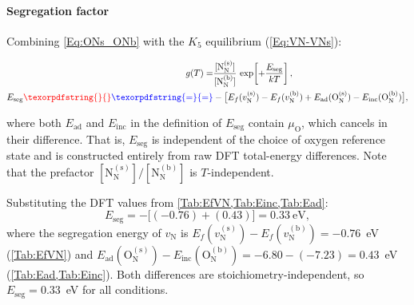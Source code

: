\documentclass[preprint,12pt,sort&compress]{elsarticle}
\newcommand{\?}{\stackrel{?}{=}}
\providecommand{\DIFaddtex}[1]{{\bf #1}} %
\providecommand{\DIFdeltex}[1]{} %
\providecommand{\DIFaddbegin}{\protect\color{blue}} %
\providecommand{\DIFaddend}{\protect\color{black}} %
\providecommand{\DIFdelbegin}{\protect\color{red}} %
\providecommand{\DIFdelend}{\protect\color{black}} %
\providecommand{\DIFadd}[1]{\texorpdfstring{\DIFaddtex{#1}}{#1}} %
\providecommand{\DIFdel}[1]{\texorpdfstring{\DIFdeltex{#1}}{}} %
\begin{document}
\paragraph{Segregation factor} Combining \cref{Eq:ONs_ONb} with the $K_5$ equilibrium (\cref{Eq:VN-VNs}):

\begin{align}
g(T) = & \frac{[\text{N}_\text{N}^{(\text{s})}]}{[\text{N}_\text{N}^{(\text{b})}]}\,\exp\!\left[+\frac{E_\text{seg}}{kT}\right], \\
E_\text{seg} \DIFdelbegin \DIFdel{\equiv }\DIFdelend \DIFaddbegin \DIFadd{= }\DIFaddend & -\bigl[E_f(v_\text{N}^{(\text{s})}) - E_f(v_\text{N}^{(\text{b})}) + E_\text{ad}(\text{O}_\text{N}^{(\text{s})}) - E_\text{inc}(\text{O}_\text{N}^{(\text{b})})\bigr],
\label{Eq:App:gT}
\end{align}

where both $E_\text{ad}$ and $E_\text{inc}$ in the definition of $E_\text{seg}$ contain $\mu_\text{O}$, which cancels in their difference. That is, $E_\text{seg}$ is independent of the choice of oxygen reference state and is constructed entirely from raw DFT total-energy differences. Note that the prefactor $[\text{N}_\text{N}^{(\text{s})}]/[\text{N}_\text{N}^{(\text{b})}]$ is $T$-independent.


Substituting the DFT values from \cref{Tab:EfVN,Tab:Einc,Tab:Ead}:
\begin{equation}
E_\text{seg} = -\bigl[(-0.76) + (0.43)\bigr] = 0.33~\text{eV},
\label{Eq:App:EsegValue}
\end{equation}
where the segregation energy of $v_\text{N}$ is $E_f(v_\text{N}^{(\text{s})}) - E_f(v_\text{N}^{(\text{b})}) = -0.76$~eV (\cref{Tab:EfVN}) and $E_\text{ad}(\text{O}_\text{N}^{(\text{s})}) - E_\text{inc}(\text{O}_\text{N}^{(\text{b})}) = -6.80 - (-7.23) = 0.43$~eV (\cref{Tab:Ead,Tab:Einc}). Both differences are stoichiometry-independent, so $E_\text{seg} = 0.33$~eV for all conditions.
\end{document}
